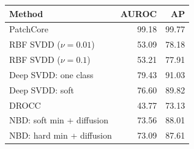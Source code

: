 \begin{tabular}{@{}lrr@{}}
\toprule
\textbf{Method} & \textbf{AUROC} & \textbf{AP}\\
\midrule
PatchCore & 99.18 & 99.77\\
RBF SVDD ($\nu=0.01$) & 53.09 & 78.18\\
RBF SVDD ($\nu=0.1$) & 53.21 & 77.91\\
Deep SVDD: one class & 79.43 & 91.03\\
Deep SVDD: soft & 76.60 & 89.82\\
DROCC & 43.77 & 73.13\\
NBD: soft min + diffusion & 73.56 & 88.01\\
NBD: hard min + diffusion & 73.09 & 87.61\\
\bottomrule
\end{tabular}
